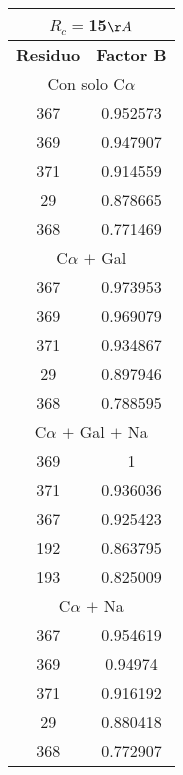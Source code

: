 \begin{tabular}[c]{|c|c|}
\multicolumn{2}{c}{$R_c=$15$\AA$}\\\hline
\textbf{Residuo}&\textbf{Factor B}\\\hline
\multicolumn{2}{c}{Con solo C$\alpha$}\\\hline
       367&  0.952573\\
       369&  0.947907\\
       371&  0.914559\\
        29&  0.878665\\
       368&  0.771469\\
\hline
\multicolumn{2}{c}{C$\alpha$ $+$ Gal}\\\hline
       367&  0.973953\\
       369&  0.969079\\
       371&  0.934867\\
        29&  0.897946\\
       368&  0.788595\\
\hline
\multicolumn{2}{c}{C$\alpha$ $+$ Gal $+$ Na}\\\hline
       369&         1\\
       371&  0.936036\\
       367&  0.925423\\
       192&  0.863795\\
       193&  0.825009\\
\hline
\multicolumn{2}{c}{C$\alpha$ $+$ Na}\\\hline
       367&  0.954619\\
       369&   0.94974\\
       371&  0.916192\\
        29&  0.880418\\
       368&  0.772907\\
\hline
\end{tabular}

